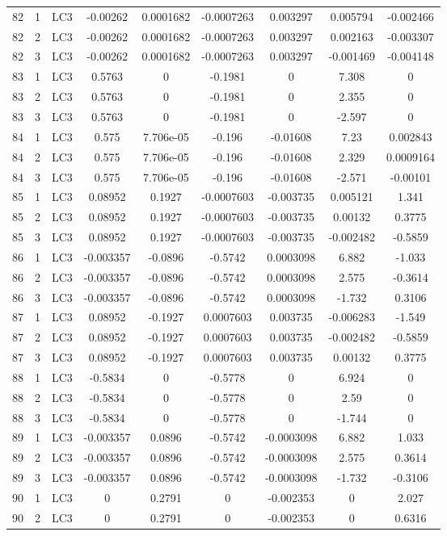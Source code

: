 \documentclass{article}%
\begin{document}
\begin{longtable}{| c c c | c c c c c c |}
82&1&LC3&{-}0.00262&0.0001682&{-}0.0007263&0.003297&0.005794&{-}0.002466\\%
82&2&LC3&{-}0.00262&0.0001682&{-}0.0007263&0.003297&0.002163&{-}0.003307\\%
82&3&LC3&{-}0.00262&0.0001682&{-}0.0007263&0.003297&{-}0.001469&{-}0.004148\\%
83&1&LC3&0.5763&0&{-}0.1981&0&7.308&0\\%
83&2&LC3&0.5763&0&{-}0.1981&0&2.355&0\\%
83&3&LC3&0.5763&0&{-}0.1981&0&{-}2.597&0\\%
84&1&LC3&0.575&7.706e{-}05&{-}0.196&{-}0.01608&7.23&0.002843\\%
84&2&LC3&0.575&7.706e{-}05&{-}0.196&{-}0.01608&2.329&0.0009164\\%
84&3&LC3&0.575&7.706e{-}05&{-}0.196&{-}0.01608&{-}2.571&{-}0.00101\\%
85&1&LC3&0.08952&0.1927&{-}0.0007603&{-}0.003735&0.005121&1.341\\%
85&2&LC3&0.08952&0.1927&{-}0.0007603&{-}0.003735&0.00132&0.3775\\%
85&3&LC3&0.08952&0.1927&{-}0.0007603&{-}0.003735&{-}0.002482&{-}0.5859\\%
86&1&LC3&{-}0.003357&{-}0.0896&{-}0.5742&0.0003098&6.882&{-}1.033\\%
86&2&LC3&{-}0.003357&{-}0.0896&{-}0.5742&0.0003098&2.575&{-}0.3614\\%
86&3&LC3&{-}0.003357&{-}0.0896&{-}0.5742&0.0003098&{-}1.732&0.3106\\%
87&1&LC3&0.08952&{-}0.1927&0.0007603&0.003735&{-}0.006283&{-}1.549\\%
87&2&LC3&0.08952&{-}0.1927&0.0007603&0.003735&{-}0.002482&{-}0.5859\\%
87&3&LC3&0.08952&{-}0.1927&0.0007603&0.003735&0.00132&0.3775\\%
88&1&LC3&{-}0.5834&0&{-}0.5778&0&6.924&0\\%
88&2&LC3&{-}0.5834&0&{-}0.5778&0&2.59&0\\%
88&3&LC3&{-}0.5834&0&{-}0.5778&0&{-}1.744&0\\%
89&1&LC3&{-}0.003357&0.0896&{-}0.5742&{-}0.0003098&6.882&1.033\\%
89&2&LC3&{-}0.003357&0.0896&{-}0.5742&{-}0.0003098&2.575&0.3614\\%
89&3&LC3&{-}0.003357&0.0896&{-}0.5742&{-}0.0003098&{-}1.732&{-}0.3106\\%
90&1&LC3&0&0.2791&0&{-}0.002353&0&2.027\\%
90&2&LC3&0&0.2791&0&{-}0.002353&0&0.6316\\%

\end{longtable}
\end{document}
